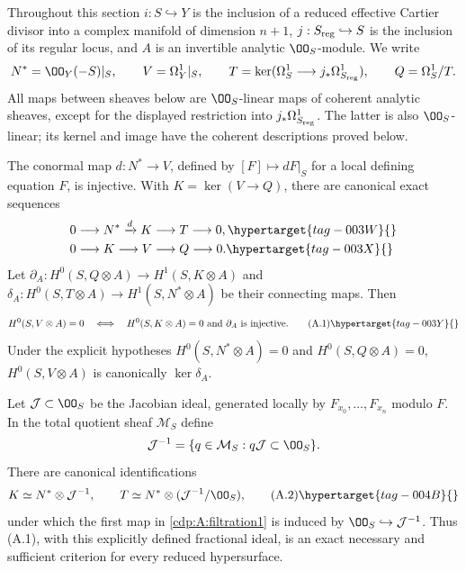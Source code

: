 Throughout this section $i:S\hookrightarrow Y$ is the inclusion of a reduced effective Cartier divisor into a complex manifold of dimension $n+1$, $j:S_{\rm reg}\hookrightarrow S$ is the inclusion of its regular locus, and $A$ is an invertible analytic $\OO_S$-module. We write
\[
 N^*=\OO_Y(-S)|_S,\qquad V=\Omega_Y^1|_S,\qquad
 T=\ker(\Omega_S^1\longrightarrow j_*\Omega^1_{S_{\rm reg}}),\qquad Q=\Omega_S^1/T.
\]
All maps between sheaves below are $\OO_S$-linear maps of coherent analytic sheaves, except for the displayed restriction into $j_*\Omega^1_{S_{\rm reg}}$. The latter is also $\OO_S$-linear; its kernel and image have the coherent descriptions proved below.



\begin{proposition}\hypertarget{tag-01AD}{}\label{cdp:st:A.1.1}

\label{wbII:prop:criterion}\label{wbII:prop:filtration}\label{wbII:lem:conormal}\label{wbII:lem:conormal-injective}\label{wbII:prop:missing-global-section-criterion}\label{wbII:prop:missing-cotangent-filtration}
The conormal map $d:N^*\to V$, defined by $[F]\mapsto dF|_S$ for a local defining equation $F$, is injective. With $K=\ker(V\to Q)$, there are canonical exact sequences
\begin{align}
0&\longrightarrow N^*\xrightarrow{d}K\longrightarrow T\longrightarrow0,
\hypertarget{tag-003W}{}\label{cdp:A:filtration1}\\
0&\longrightarrow K\longrightarrow V\longrightarrow Q\longrightarrow0.
\hypertarget{tag-003X}{}\label{cdp:A:filtration2}
\end{align}
Let $\partial_A:H^0(S,Q\otimes A)\to H^1(S,K\otimes A)$ and $\delta_A:H^0(S,T\otimes A)\to H^1(S,N^*\otimes A)$ be their connecting maps. Then
\[
 H^0(S,V\otimes A)=0
 \quad\Longleftrightarrow\quad
 H^0(S,K\otimes A)=0\ \hbox{and}\ \partial_A\hbox{ is injective}.
\tag{A.1}\hypertarget{tag-003Y}{}\label{cdp:eq:A.1}
\]
Under the explicit hypotheses $H^0(S,N^*\otimes A)=0$ and $H^0(S,Q\otimes A)=0$, $H^0(S,V\otimes A)$ is canonically $\ker\delta_A$.
\end{proposition}

\begin{proposition}\hypertarget{tag-01AF}{}\label{cdp:st:A.2.1}


Let $\mathcal J\subset\OO_S$ be the Jacobian ideal, generated locally by $F_{x_0},\ldots,F_{x_n}$ modulo $F$. In the total quotient sheaf $\mathcal M_S$ define
\[
 \mathcal J^{-1}=\{q\in\mathcal M_S:q\mathcal J\subset\OO_S\}.
\]
There are canonical identifications
\[
 K\simeq N^*\otimes\mathcal J^{-1},\qquad
 T\simeq N^*\otimes(\mathcal J^{-1}/\OO_S),
\tag{A.2}\hypertarget{tag-004B}{}\label{cdp:eq:A.2}
\]
under which the first map in \eqref{cdp:A:filtration1} is induced by $\OO_S\hookrightarrow\mathcal J^{-1}$. Thus (A.1), with this explicitly defined fractional ideal, is an exact necessary and sufficient criterion for every reduced hypersurface.
\end{proposition}

